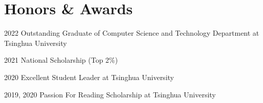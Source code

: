 \section{Honors \& Awards}
        
        \begin{samepage}
            \begin{twocolentry}[1.5 cm]{
                2022
            }
                Outstanding Graduate of Computer Science and Technology Department at Tsinghua University
            \end{twocolentry}

            \vspace{0.10 cm}

            \begin{twocolentry}{
                2021
            }
                National Scholarship (Top 2\%)
            \end{twocolentry}


            \vspace{0.10 cm}
            \begin{twocolentry}{
                2020
            }
                Excellent Student Leader at Tsinghua University 
            \end{twocolentry}

            \vspace{0.10 cm}
            \begin{twocolentry}{
                2019, 2020
            }
                Passion For Reading Scholarship at Tsinghua University 
            \end{twocolentry}





\end{samepage}
